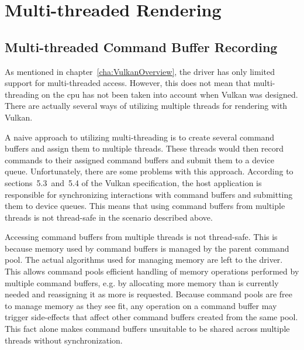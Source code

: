   \section{Multi-threaded Rendering}
  \label{sec:MultithreadedRendering}
    \tbd

    \subsection{Multi-threaded Command Buffer Recording}
      As mentioned in chapter~\ref{cha:VulkanOverview}, the \gls{driver} has only limited support for multi-threaded access.
      However, this does not mean that multi-threading on the \gls{cpu} has not been taken into account when Vulkan was designed.
      There are actually several ways of utilizing multiple threads for rendering with Vulkan.

      A naive approach to utilizing multi-threading is to create several command buffers and assign them to multiple threads.
      These threads would then record commands to their assigned command buffers and submit them to a device queue.
      Unfortunately, there are some problems with this approach.
      According to sections~5.3~and~5.4 of the Vulkan specification\cite{vkspec}, the host application is responsible for synchronizing interactions with command buffers and submitting them to device queues.
      This means that using command buffers from multiple threads is not thread-safe in the scenario described above.

      Accessing command buffers from multiple threads is not thread-safe.
      This is because memory used by command buffers is managed by the parent command pool.
      The actual algorithms used for managing memory are left to the \gls{driver}.
      This allows command pools efficient handling of memory operations performed by multiple command buffers, e.g. by allocating more memory than is currently needed and reassigning it as more is requested.
      Because command pools are free to manage memory as they see fit, any operation on a command buffer may trigger side-effects that affect other command buffers created from the same pool.
      This fact alone makes command buffers unsuitable to be shared across multiple threads without synchronization.

